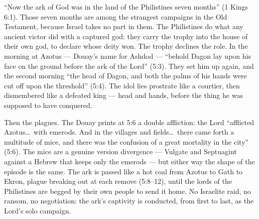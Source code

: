 ``Now the ark of God was in the land of the Philistines seven
months'' (1 Kings 6:1). Those seven
months are among the strangest campaigns in the Old Testament, because
Israel takes no part in them. The Philistines do what any ancient victor
did with a captured god: they carry the trophy into the house of their own
god, to declare whose deity won. The trophy declines the role. In the
morning at Azotus --- Douay's name for Ashdod --- ``behold Dagon lay upon
his face on the ground before the ark of the Lord'' (5:3). They set him up
again, and the second morning ``the head of Dagon, and both the palms of
his hands were cut off upon the
threshold'' (5:4). The idol lies prostrate
like a courtier, then dismembered like a defeated king --- head and hands,
before the thing he was supposed to have conquered.

Then the plagues. The Douay prints at 5:6 a double affliction: the Lord
``afflicted Azotus\ldots\ with emerods. And in the villages and
fields\ldots\ there came forth a multitude of mice, and there was the
confusion of a great mortality in the city'' (5:6). The mice are a genuine version divergence
--- Vulgate and Septuagint against a Hebrew that keeps only the emerods
--- but either way the shape of the episode is the same.
The ark is passed like a hot coal from Azotus to Gath to Ekron, plague
breaking out at each remove (5:8--12), until the lords of the Philistines
are begged by their own people to send it home. No Israelite raid, no
ransom, no negotiation: the ark's captivity is conducted, from first to
last, as the Lord's solo campaign.

